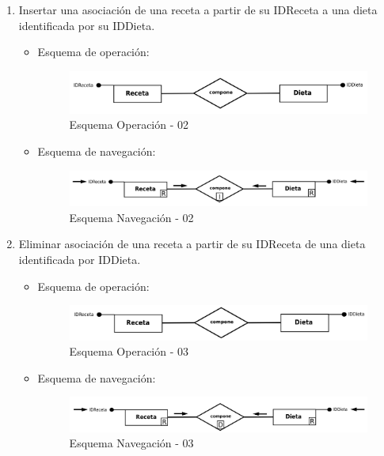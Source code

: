 \documentclass[a4paper,12pt]{report}
\begin{document}
\begin{enumerate}
\item Insertar una asociación de una receta a partir de su IDReceta a
una dieta identificada por su IDDieta.
\begin{itemize}
\item Esquema de operación:
\begin{figure}[!htp]
\centering
\includegraphics[width=0.9\linewidth]{./operaciones/img/Dietas/02_ope.png}
\caption{Esquema Operación - 02}
\label{fig:ope02}
\medskip
\footnotesize
{}
\end{figure}
\item Esquema de navegación:
\begin{figure}[!htp]
\centering
\includegraphics[width=0.9\linewidth]{./operaciones/img/Dietas/02_nav.png}
\caption{Esquema Navegación - 02}
\label{fig:nave02}
\medskip
\footnotesize
{}
\end{figure}
\end{itemize}

\item Eliminar asociación de una receta a partir de su IDReceta de
una dieta identificada por IDDieta.
\begin{itemize}
\item Esquema de operación:
\begin{figure}[!htp]
\centering
\includegraphics[width=0.9\linewidth]{./operaciones/img/Dietas/03_ope.png}
\caption{Esquema Operación - 03}
\label{fig:ope03}
\medskip
\footnotesize
{}
\end{figure}
\item Esquema de navegación:
\begin{figure}[!htp]
\centering
\includegraphics[width=0.9\linewidth]{./operaciones/img/Dietas/03_nav.png}
\caption{Esquema Navegación - 03}
\label{fig:nave03}
\medskip
\footnotesize
{}
\end{figure}
\end{itemize}


\end{enumerate}
\end{document}

